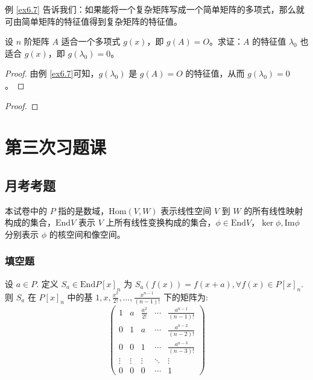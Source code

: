 \documentclass[lang=cn,12pt]{elegantbook}
\begin{document}
\begin{remark}
    例 \ref{ex6.7} 告诉我们：如果能将一个复杂矩阵写成一个简单矩阵的多项式，那么就可由简单矩阵的特征值得到复杂矩阵的特征值。
\end{remark}

\begin{example}
    设 \( n \) 阶矩阵 \( A \) 适合一个多项式 \( g(x) \)，即 \( g(A) = O \)。求证：\( A \) 的特征值 \( \lambda_0 \) 也适合 \( g(x) \)，即 \( g(\lambda_0) = 0 \)。
\end{example}
    
\begin{proof}
    由例 \ref{ex6.7}可知，\( g(\lambda_0) \) 是 \( g(A) = O \) 的特征值，从而 \( g(\lambda_0) = 0 \)。
\end{proof}

\begin{example}
    
\end{example}

\begin{proof}
    
\end{proof}

\chapter{第三次习题课}

\section{月考考题}
本试卷中的 \(P\) 指的是数域，\(\mathrm{Hom}(V,W)\) 表示线性空间 \(V\) 到 \(W\) 的所有线性映射构成的集合，\(\mathrm{End}V\) 表示 \(V\) 上所有线性变换构成的集合，\(\phi \in \mathrm{End}V\)，\(\ker \phi ,\mathrm{Im}\phi\) 分别表示 \(\phi\) 的核空间和像空间。
\subsection{填空题}
\begin{example}
    设 \(a\in P.\) 定义 \(S_{a}\in \mathrm{End}P[x]_{n}\) 为 \(S_{a}(f(x)) = f(x + a),\forall f(x)\in P[x]_{n}.\) 则 \(S_{a}\) 在 \(P[x]_{n}\) 中的基 \(1,x,\frac{x^{2}}{2!},\dots ,\frac{x^{n - 1}}{(n - 1)!}\) 下的矩阵为:
    \[
    \begin{pmatrix}
    1 & a & \frac{a^2}{2!} & \cdots & \frac{a^{n-1}}{(n-1)!} \\
    0 & 1 & a & \cdots & \frac{a^{n-2}}{(n-2)!} \\
    0 & 0 & 1 & \cdots & \frac{a^{n-3}}{(n-3)!} \\
    \vdots & \vdots & \vdots & \ddots & \vdots \\
    0 & 0 & 0 & \cdots & 1
    \end{pmatrix}
    \]
\end{example}
\end{document}
